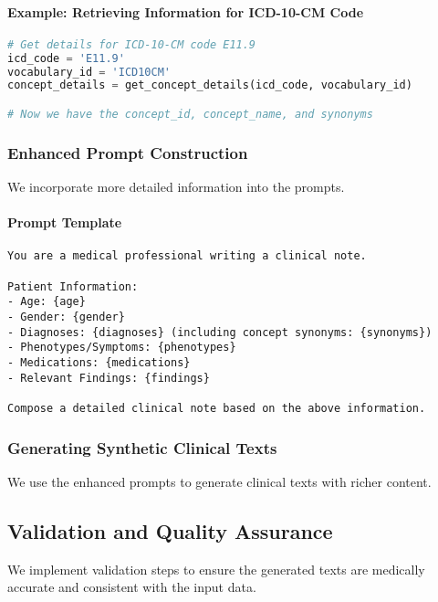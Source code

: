 \documentclass[12pt, a4paper]{article}
\begin{document}
\paragraph{Example: Retrieving Information for ICD-10-CM Code}

\begin{lstlisting}[language=Python]
# Get details for ICD-10-CM code E11.9
icd_code = 'E11.9'
vocabulary_id = 'ICD10CM'
concept_details = get_concept_details(icd_code, vocabulary_id)

# Now we have the concept_id, concept_name, and synonyms
\end{lstlisting}

\subsubsection{Enhanced Prompt Construction}

We incorporate more detailed information into the prompts.

\paragraph{Prompt Template}

\begin{lstlisting}
You are a medical professional writing a clinical note.

Patient Information:
- Age: {age}
- Gender: {gender}
- Diagnoses: {diagnoses} (including concept synonyms: {synonyms})
- Phenotypes/Symptoms: {phenotypes}
- Medications: {medications}
- Relevant Findings: {findings}

Compose a detailed clinical note based on the above information.
\end{lstlisting}

\subsubsection{Generating Synthetic Clinical Texts}

We use the enhanced prompts to generate clinical texts with richer content.

\subsection{Validation and Quality Assurance}

We implement validation steps to ensure the generated texts are medically accurate and consistent with the input data.
\end{document}
